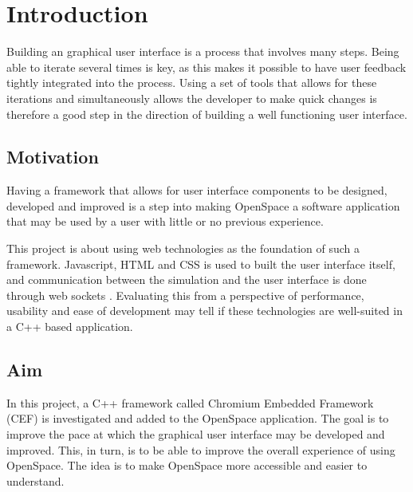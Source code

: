 \chapter{Introduction}
\label{cha:introduction}

Building an graphical user interface is a process that involves many steps.   Being able to iterate several times is key, as this makes it possible to have user feedback tightly integrated into the process. Using a set of tools that allows for these iterations and simultaneously allows the developer to make quick changes is therefore a good step in the direction of building a well functioning user interface.

\section{Motivation}
\label{sec:motivation}


Having a framework that allows for user interface components to be designed, developed and improved is a step into making OpenSpace \cite{jossos} a software application that may be used by a user with little or no previous experience.

This project is about using web technologies as the foundation of such a framework. Javascript, HTML and CSS  is used to built the user interface itself, and communication between the simulation and the user interface is done through web sockets \cite{fette2011websocket}. Evaluating this from a perspective of performance, usability and ease of development may tell if these technologies are well-suited in a C++ based application.

\section{Aim}
\label{sec:aim}


In this project, a C++ framework called Chromium Embedded Framework (CEF) is investigated and added to the OpenSpace application. The goal is to improve the pace at which the graphical user interface may be developed and improved. This, in turn, is to be able to improve the overall experience of using OpenSpace. The idea is to make OpenSpace more accessible and easier to understand.

